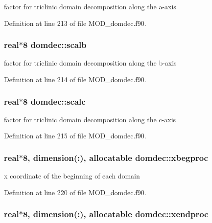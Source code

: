 factor for triclinic domain decomposition along the a-\/axis 



Definition at line 213 of file M\-O\-D\-\_\-domdec.\-f90.

\hypertarget{classdomdec_a23f02d2e4ca2feba1b70a3d4d5c15f2b}{
\subsubsection[{scalb}]{\setlength{\rightskip}{0pt plus 5cm}real$\ast$8 domdec\-::scalb}}\label{classdomdec_a23f02d2e4ca2feba1b70a3d4d5c15f2b}


factor for triclinic domain decomposition along the b-\/axis 



Definition at line 214 of file M\-O\-D\-\_\-domdec.\-f90.

\hypertarget{classdomdec_a5176236515e982fadc86d9efe2b8782f}{
\subsubsection[{scalc}]{\setlength{\rightskip}{0pt plus 5cm}real$\ast$8 domdec\-::scalc}}\label{classdomdec_a5176236515e982fadc86d9efe2b8782f}


factor for triclinic domain decomposition along the c-\/axis 



Definition at line 215 of file M\-O\-D\-\_\-domdec.\-f90.

\hypertarget{classdomdec_acf6c7964e86a91e7727f69aa2e00df61}{
\subsubsection[{xbegproc}]{\setlength{\rightskip}{0pt plus 5cm}real$\ast$8, dimension(\-:), allocatable domdec\-::xbegproc}}\label{classdomdec_acf6c7964e86a91e7727f69aa2e00df61}


x coordinate of the beginning of each domain 



Definition at line 220 of file M\-O\-D\-\_\-domdec.\-f90.

\hypertarget{classdomdec_a2a7289d6a16677c917c732f0eddf76f1}{
\subsubsection[{xendproc}]{\setlength{\rightskip}{0pt plus 5cm}real$\ast$8, dimension(\-:), allocatable domdec\-::xendproc}}\label{classdomdec_a2a7289d6a16677c917c732f0eddf76f1}


